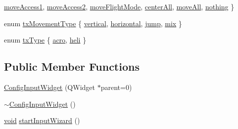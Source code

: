 \begin{DoxyCompactItemize}
\hyperlink{group___config_plugin_gga71db16a79c805267a16c0c9e5279c771accba4328323fd723e7691bcdce3a8547}{move\-Access1}, 
\hyperlink{group___config_plugin_gga71db16a79c805267a16c0c9e5279c771a3624f52a3d05052bd24c3b0d86db6c6b}{move\-Access2}, 
\hyperlink{group___config_plugin_gga71db16a79c805267a16c0c9e5279c771a3f7cc03e05b6b72499a8bc0cde79654b}{move\-Flight\-Mode}, 
\*
\hyperlink{group___config_plugin_gga71db16a79c805267a16c0c9e5279c771a08eb474ab3ac31710490f3b35981be5e}{center\-All}, 
\hyperlink{group___config_plugin_gga71db16a79c805267a16c0c9e5279c771a5e1b4078e27ae79a3c14ca5c0fc1c65f}{move\-All}, 
\hyperlink{group___config_plugin_gga71db16a79c805267a16c0c9e5279c771a08d3165356dfe15a598a89c8985a4745}{nothing}
 \}
\item 
enum \hyperlink{group___config_plugin_gac685fb340fffc7f7f70228ddf964dbb1}{tx\-Movement\-Type} \{ \hyperlink{group___config_plugin_ggac685fb340fffc7f7f70228ddf964dbb1ac986898babbd9e3d8655246308c6c50d}{vertical}, 
\hyperlink{group___config_plugin_ggac685fb340fffc7f7f70228ddf964dbb1a69ea61c7956a0a30c1f857ee2ef29269}{horizontal}, 
\hyperlink{group___config_plugin_ggac685fb340fffc7f7f70228ddf964dbb1a58c89d811ab55d6c36d01a13209a4d9a}{jump}, 
\hyperlink{group___config_plugin_ggac685fb340fffc7f7f70228ddf964dbb1a2f00c0717a77ee441b973ebfe659f81b}{mix}
 \}
\item 
enum \hyperlink{group___config_plugin_gacaf6a4fddc50fe17f03bed7e270ddc8c}{tx\-Type} \{ \hyperlink{group___config_plugin_ggacaf6a4fddc50fe17f03bed7e270ddc8ca782ad1c93bcdc2b5dc9460073fa8e744}{acro}, 
\hyperlink{group___config_plugin_ggacaf6a4fddc50fe17f03bed7e270ddc8ca3fa8b56ad14c1b83059f0b6f4c798a82}{heli}
 \}
\end{DoxyCompactItemize}
\subsection*{\-Public \-Member \-Functions}
\begin{DoxyCompactItemize}
\item 
\hyperlink{group___config_plugin_ga5453669d3da8b5752b88e14cfca3ba03}{\-Config\-Input\-Widget} (\-Q\-Widget $\ast$parent=0)
\item 
\hyperlink{group___config_plugin_gaa2ae4d78db5c283094de22747cd958b8}{$\sim$\-Config\-Input\-Widget} ()
\item 
\hyperlink{group___u_a_v_objects_plugin_ga444cf2ff3f0ecbe028adce838d373f5c}{void} \hyperlink{group___config_plugin_gaad3d50c5993be3628b91188aad094505}{start\-Input\-Wizard} ()
\end{DoxyCompactItemize}
